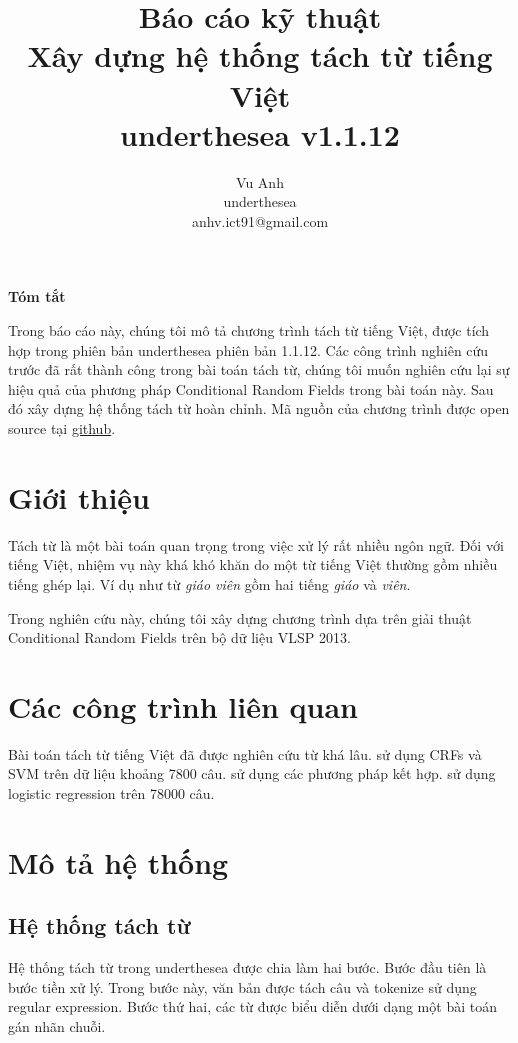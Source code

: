 \documentclass[11pt,a4paper]{article}
\title{Báo cáo kỹ thuật\\ Xây dựng hệ thống tách từ tiếng Việt \\ underthesea v1.1.12}
\author{
Vu Anh\\
underthesea\\
anhv.ict91@gmail.com
}
\date{}
\renewenvironment{abstract}%
{\centerline{\large\bf Tóm tắt}%
\begin{list}{}%
{\setlength{\rightmargin}{0.6cm}%
\setlength{\leftmargin}{0.6cm}}%
\item[]\ignorespaces}%
{\unskip\end{list}}
\begin{document}
\maketitle
\begin{abstract}

Trong báo cáo này, chúng tôi mô tả chương trình tách từ tiếng Việt, được tích hợp trong phiên bản underthesea phiên bản 1.1.12.
Các công trình nghiên cứu trước đã rất thành công trong bài toán tách từ, chúng tôi muốn nghiên cứu lại sự hiệu quả của phương pháp Conditional Random Fields trong bài toán này. Sau đó xây dựng hệ thống tách từ hoàn chỉnh.
Mã nguồn của chương trình được open source tại \href{https://github.com/undertheseanlp/word_tokenize}{github}.

\end{abstract}

\section{Giới thiệu}

Tách từ là một bài toán quan trọng trong việc xử lý rất nhiều ngôn ngữ. Đối với tiếng Việt, nhiệm vụ này khá khó khăn do một từ tiếng Việt thường gồm nhiều tiếng ghép lại. Ví dụ như từ \textit{giáo viên} gồm hai tiếng \textit{giáo} và \textit{viên}.

Trong nghiên cứu này, chúng tôi xây dựng chương trình dựa trên giải thuật Conditional Random Fields trên bộ dữ liệu VLSP 2013.

\section{Các công trình liên quan}

Bài toán tách từ tiếng Việt đã được nghiên cứu từ khá lâu. \citet{Nguyen2006VietnameseWS} sử dụng CRFs và SVM trên dữ liệu khoảng 7800 câu. \citet{huyen2008hybrid} sử dụng các phương pháp kết hợp. \citet{7800279} sử dụng logistic regression trên 78000 câu.

\section{Mô tả hệ thống}

\subsection{Hệ thống tách từ}

Hệ thống tách từ trong underthesea được chia làm hai bước. Bước đầu tiên là bước tiền xử lý. Trong bước này, văn bản được tách câu và tokenize sử dụng regular expression. Bước thứ hai, các từ được biểu diễn dưới dạng một bài toán gán nhãn chuỗi.
\end{document}
